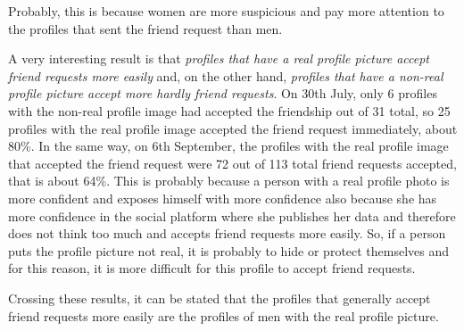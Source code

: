 Probably, this is because women are more suspicious and pay more attention to the profiles that sent the friend request than men.
\par \noindent 
A very interesting result is that \textit{profiles that have a real profile picture accept friend requests more easily} and, on the other hand, \textit{profiles that have a non-real profile picture accept more hardly friend requests}. 
On 30th July, only 6 profiles with the non-real profile image had accepted the friendship out of 31 total, so 25 profiles with the real profile image accepted the friend request immediately, about 80\%.
In the same way, on 6th September, the profiles with the real profile image that accepted the friend request were 72 out of 113 total friend requests accepted, that is about 64\%.
This is probably because a person with a real profile photo is more confident and exposes himself with more confidence also because she has more confidence in the social platform where she publishes her data and therefore does not think too much and accepts friend requests more easily. So, if a person puts the profile picture not real, it is probably to hide or protect themselves and for this reason, it is more difficult for this profile to accept friend requests.
\par \noindent 
Crossing these results, it can be stated that the profiles that generally accept friend requests more easily are the profiles of men with the real profile picture.
\newpage
